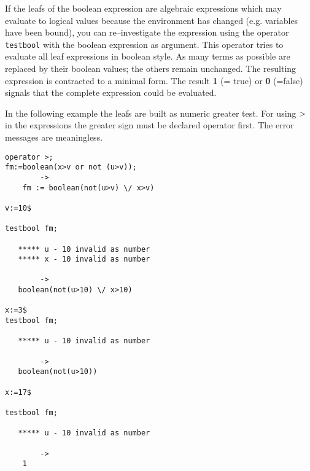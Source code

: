 If the leafs of the boolean expression are algebraic expressions
which may evaluate to logical values because the environment
has changed (e.g. variables have been bound), you can re--investigate
the expression using the operator {\tt testbool} with the boolean
expression as argument. This operator tries to evaluate all
leaf expressions in \REDUCE boolean style. As many
terms as possible are replaced by their boolean values; the others
remain unchanged. The resulting expression is contracted to a
minimal form. The result {\bf 1} (= true) or {\bf 0} (=false)
signals that the complete expression could be evaluated. 

In the following example the leafs are built as numeric greater test.
For using ${\bf >}$ in the expressions the greater sign must
be declared operator first. The error messages are meaningless.
\begin{verbatim}
operator >;
fm:=boolean(x>v or not (u>v));
        ->
    fm := boolean(not(u>v) \/ x>v)

v:=10$

testbool fm;

   ***** u - 10 invalid as number
   ***** x - 10 invalid as number

        ->
   boolean(not(u>10) \/ x>10)

x:=3$
testbool fm;

   ***** u - 10 invalid as number

        ->
   boolean(not(u>10))

x:=17$

testbool fm;

   ***** u - 10 invalid as number
      
        ->
    1
 
\end{verbatim}


